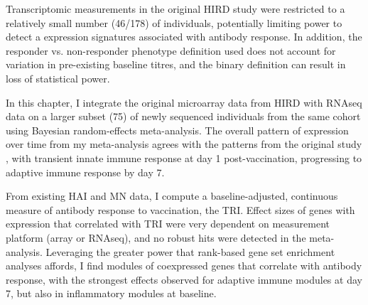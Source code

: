 Transcriptomic measurements in the original \gls{HIRD} study were restricted to a relatively small number (46/178) of individuals, potentially limiting power to detect a expression signatures associated with antibody response.
In addition, the responder vs. non-responder phenotype definition used does not account for variation in pre-existing baseline titres, and the binary definition can result in loss of statistical power\autocite{cohen1983CostDichotomization, senn2005DichotomaniaObsessiveCompulsive, fedorov2009ConsequencesDichotomization}.

In this chapter, I integrate the original microarray data from \gls{HIRD} with \gls{RNAseq} data on a larger subset (75) of newly sequenced individuals from the same cohort using Bayesian random-effects meta-analysis.
The overall pattern of expression over time from my meta-analysis agrees with the patterns from the original study \autocite{sobolev2016AdjuvantedInfluenzaH1N1Vaccination}, with transient innate immune response at day 1 post-vaccination, progressing to adaptive immune response by day 7.

From existing \gls{HAI} and \gls{MN} data, I compute a baseline-adjusted, continuous measure of antibody response to vaccination, the \gls{TRI}\autocite{bucasas2011EarlyPatternsGene}.
Effect sizes of genes with expression that correlated with \gls{TRI} were very dependent on measurement platform (array or \gls{RNAseq}), and no robust hits were detected in the meta-analysis.
Leveraging the greater power that rank-based gene set enrichment analyses affords, I find modules of coexpressed genes that correlate with antibody response, with the strongest effects observed for adaptive immune modules at day 7, but also in inflammatory modules at baseline.

